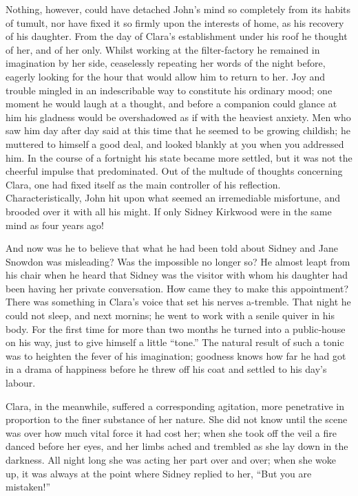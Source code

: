 {}Nothing, however, could have detached John's mind so completely from
its habits of tumult, nor have fixed it so firmly upon the interests of
home, as his recovery of his daughter. From the day of Clara's
establishment under his roof he thought of her, and of her only. Whilst
working at the filter-factory he remained in imagination by her side,
ceaselessly repeating her words of the night before, eagerly looking for
the hour that would allow him to return to her. Joy and trouble mingled
in an indescribable way to constitute his ordinary mood; one moment he
would laugh at a thought, and before a companion could glance at him his
gladness would be overshadowed as if with the heaviest anxiety. Men who
saw him day after day said at this time that he seemed to be growing
childish; he muttered to himself a good deal, and looked blankly at you
when you addressed him. In the course of a fortnight his state became
more settled, but it was not the cheerful impulse that predominated. Out
of the multude of thoughts concerning Clara, one had fixed itself as the
main controller of his reflection. Characteristically, John hit upon
{}what seemed an irremediable misfortune, and brooded over it with all
his might. If only Sidney Kirkwood were in the same mind as four years
ago!

And now was he to believe that what he had been told about Sidney and
Jane Snowdon was misleading? Was the impossible no longer so? He almost
leapt from his chair when he heard that Sidney was the visitor with whom
his daughter had been having her private conversation. How came they to
make this appointment? There was something in Clara's voice that set his
nerves a-tremble. That night he could not sleep, and next mornins; he
went to work with a senile quiver in his body. For the first time for
more than two months he turned into a public-house on his way, just to
give himself a little ``tone.'' The natural result of such a tonic was
to heighten the fever of his imagination; goodness knows how far he had
got in a drama of happiness before he threw off his coat and settled to
his day's labour.

Clara, in the meanwhile, suffered a corresponding agitation, more
penetrative in proportion to the finer substance of her nature. {}She
did not know until the scene was over how much vital force it had cost
her; when she took off the veil a fire danced before her eyes, and her
limbs ached and trembled as she lay down in the darkness. All night long
she was acting her part over and over; when she woke up, it was always
at the point where Sidney replied to her, ``But you are mistaken!''

